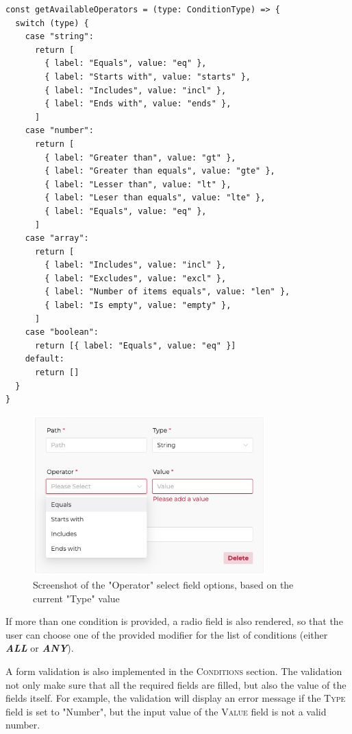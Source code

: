       \begin{lstlisting}[style=es6, caption={Function to get list of available operators based on a condition's type attribute (TypeScript)}]
const getAvailableOperators = (type: ConditionType) => {
  switch (type) {
    case "string":
      return [
        { label: "Equals", value: "eq" },
        { label: "Starts with", value: "starts" },
        { label: "Includes", value: "incl" },
        { label: "Ends with", value: "ends" },
      ]
    case "number":
      return [
        { label: "Greater than", value: "gt" },
        { label: "Greater than equals", value: "gte" },
        { label: "Lesser than", value: "lt" },
        { label: "Leser than equals", value: "lte" },
        { label: "Equals", value: "eq" },
      ]
    case "array":
      return [
        { label: "Includes", value: "incl" },
        { label: "Excludes", value: "excl" },
        { label: "Number of items equals", value: "len" },
        { label: "Is empty", value: "empty" },
      ]
    case "boolean":
      return [{ label: "Equals", value: "eq" }]
    default:
      return []
  }
}
      \end{lstlisting}

      \begin{figure}[!ht]
        \centering
        \includegraphics[width=0.8\textwidth]{images/ss_condition_op.jpeg}
        \caption{Screenshot of the "Operator" select field options, based on the current "Type" value}
      \end{figure}
      
      If more than one condition is provided, a radio field is also rendered, so that the user can choose one of the provided modifier for the list of conditions (either \textbf{\emph{ALL}} or \textbf{\emph{ANY}}). 

      A form validation is also implemented in the \textsc{Conditions} section. The validation not only make sure that all the required fields are filled, but also the value of the fields itself. For example, the validation will display an error message if the \textsc{Type} field is set to "Number", but the input value of the \textsc{Value} field is not a valid number. 


